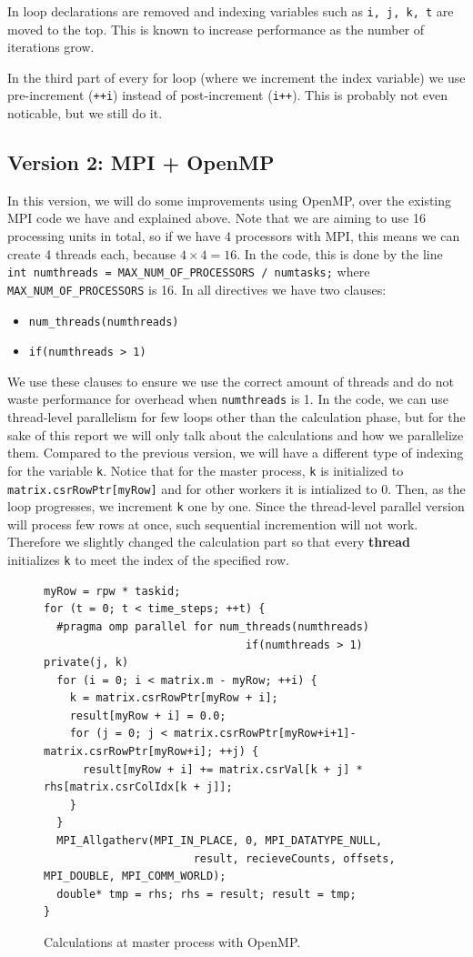 \documentclass[12pt,reqno]{amsart}
\newcommand{\code}[1]{\texttt{#1}}
\begin{document}
In loop declarations are removed and indexing variables such as \code{i, j, k, t} are moved to the top. This is known to increase performance as the number of iterations grow.

In the third part of every for loop (where we increment the index variable) we use pre-increment (\code{++i}) instead of post-increment (\code{i++}). This is probably not even noticable, but we still do it.

\subsection{Version 2: MPI + OpenMP}
In this version, we will do some improvements using OpenMP, over the existing MPI code we have and explained above. Note that we are aiming to use 16 processing units in total, so if we have 4 processors with MPI, this means we can create 4 threads each, because $4\times4=16$. In the code, this is done by the line \code{int numthreads = MAX\_NUM\_OF\_PROCESSORS / numtasks;} where \code{MAX\_NUM\_OF\_PROCESSORS} is 16. In all directives we have two clauses:
\begin{itemize}
	\item \code{num\_threads(numthreads)}
	\item \code{if(numthreads > 1)}
\end{itemize}
We use these clauses to ensure we use the correct amount of threads and do not waste performance for overhead when \code{numthreads} is 1. In the code, we can use thread-level parallelism for few loops other than the calculation phase, but for the sake of this report we will only talk about the calculations and how we parallelize them. Compared to the previous version, we will have a different type of indexing for the variable \code{k}. Notice that for the master process, \code{k} is initialized to \code{ matrix.csrRowPtr[myRow]} and for other workers it is intialized to 0. Then, as the loop progresses, we increment \code{k} one by one. Since the thread-level parallel version will process few rows at once, such sequential incremention will not work. Therefore we slightly changed the calculation part so that every \textbf{thread} initializes \code{k} to meet the index of the specified row.

\begin{figure}[h]
\centering
\begin{lstlisting}
myRow = rpw * taskid;
for (t = 0; t < time_steps; ++t) {	
  #pragma omp parallel for num_threads(numthreads) 
                               if(numthreads > 1) private(j, k)
  for (i = 0; i < matrix.m - myRow; ++i) { 
    k = matrix.csrRowPtr[myRow + i];
    result[myRow + i] = 0.0;
    for (j = 0; j < matrix.csrRowPtr[myRow+i+1]-matrix.csrRowPtr[myRow+i]; ++j) {
      result[myRow + i] += matrix.csrVal[k + j] * rhs[matrix.csrColIdx[k + j]];
    }
  }
  MPI_Allgatherv(MPI_IN_PLACE, 0, MPI_DATATYPE_NULL, 
                       result, recieveCounts, offsets, MPI_DOUBLE, MPI_COMM_WORLD);
  double* tmp = rhs; rhs = result; result = tmp;
}
\end{lstlisting}
\caption{Calculations at master process with OpenMP.}
\label{fig:calc_master_openmp}
\end{figure}
\end{document}
